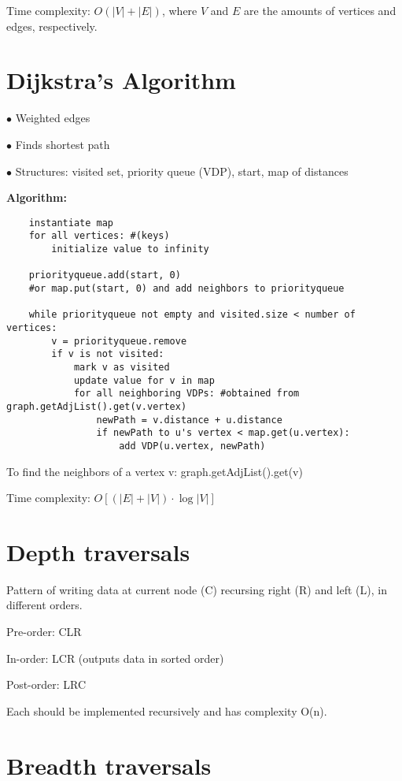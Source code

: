 \documentclass[english,openany]{book}
\begin{document}
    Time complexity: $O(|V| + |E|)$, where $V$ and $E$ are the amounts of vertices and edges, respectively.
    \newpage

    \section{Dijkstra's Algorithm}

    $\bullet$ Weighted edges

    $\bullet$ Finds shortest path

    $\bullet$ Structures: visited set, priority queue (VDP), start, map of distances

    \textbf{Algorithm:}

    \begin{lstlisting}
    instantiate map
    for all vertices: #(keys)
        initialize value to infinity

    priorityqueue.add(start, 0)
    #or map.put(start, 0) and add neighbors to priorityqueue

    while priorityqueue not empty and visited.size < number of vertices:
        v = priorityqueue.remove
        if v is not visited:
            mark v as visited
            update value for v in map
            for all neighboring VDPs: #obtained from graph.getAdjList().get(v.vertex)
                newPath = v.distance + u.distance
                if newPath to u's vertex < map.get(u.vertex):
                    add VDP(u.vertex, newPath)

    \end{lstlisting}

    To find the neighbors of a vertex v: graph.getAdjList().get(v)

    Time complexity: $O[(|E| + |V|)\cdot \log |V|]$

    \section{Depth traversals}

	Pattern of writing data at current node (C) recursing right (R) and left (L), in different orders.

	Pre-order: CLR

	In-order: LCR (outputs data in sorted order)

	Post-order: LRC

	Each should be implemented recursively and has complexity O(n).\\

	\section{Breadth traversals}
\end{document}
